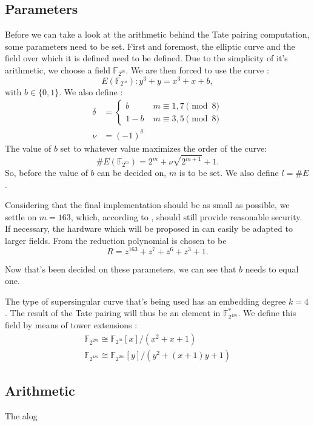 \subsection{Parameters}

Before we can take a look at the arithmetic behind the Tate pairing computation, some parameters need to be set. First and foremost, the elliptic curve and the field over which it is defined need to be defined. Due to the simplicity of it's arithmetic, we choose a field $\mathbb{F}_{2^m}$. We are then forced to use the curve \cite{barreto-efficient}:
\begin{displaymath}
E(\mathbb{F}_{2^m}) : y^3 + y = x^3 + x + b,
\end{displaymath}
with $b \in \{0,1\}$. We also define \cite{beuchat}:
\begin{displaymath}\begin{aligned}
\delta	&= \begin{cases}
				b		\qquad &m \equiv 1, 7 \pmod 8\\
				1 - b			&m \equiv 3, 5	\pmod 8
				\end{cases}\\
\nu		&= (-1)^{\delta}
\end{aligned}\end{displaymath}
The value of $b$ set to whatever value maximizes the order of the curve:
\begin{displaymath}
\#E(\mathbb{F}_{2^m}) = 2^m + \nu \sqrt{2^{m+1}} + 1.
\end{displaymath}
So, before the value of $b$ can be decided on, $m$ is to be set. We also define $l = \#E$.

Considering that the final implementation should be as small as possible, we settle on $m = 163$, which, according to \cite{lenstra}, should still provide reasonable security. If necessary, the hardware which will be proposed in  can easily be adapted to larger fields. From \cite{sec2} the reduction polynomial is chosen to be 
\begin{displaymath}
R = z^{163} + z^7 + z^6 + z^3 + 1.
\end{displaymath}

Now that's been decided on these parameters, we can see that $b$ needs to equal one.

The type of supersingular curve that's being used has an embedding degree $k = 4$. The result of the Tate pairing will thus be an element in $\mathbb{F}_{2^{4 m}}^*$. We define this field by means of tower extensions \cite{bertoni}:
\begin{displaymath}\begin{gathered}
\mathbb{F}_{2^{2 m}} \cong \mathbb{F}_{2^{m}}[x]/\left(x^2 + x + 1\right)\\
\mathbb{F}_{2^{4 m}} \cong \mathbb{F}_{2^{2 m}}[y]/\left(y^2 + (x + 1)y + 1\right)
\end{gathered}\end{displaymath}

\subsection{Arithmetic}

The alog
